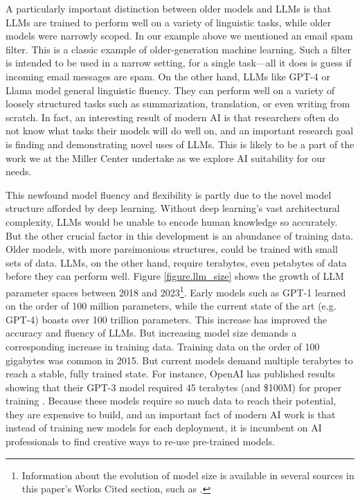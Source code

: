 \documentclass[12pt, oneside]{article}   	%
\begin{document}
A particularly important distinction between older models and LLMs is that LLMs are trained to perform well on a variety of linguistic tasks, while older models were narrowly scoped.  In our example above we mentioned an email spam filter.  This is a classic example of older-generation machine learning.  Such a filter is intended to be used in a narrow setting, for a single task---all it does is guess if incoming email messages are spam.  On the other hand, LLMs like GPT-4 or Llama model general linguistic fluency.  They can perform well on a variety of loosely structured tasks such as summarization, translation, or even writing from scratch.  In fact, an interesting result of modern AI is that researchers often do not know what tasks their models will do well on, and an important research goal is finding and demonstrating novel uses of LLMs.  This is likely to be a part of the work we at the Miller Center undertake as we explore AI suitability for our needs.

This newfound model fluency and flexibility is partly due to the novel model structure afforded by deep learning.  Without deep learning’s vast architectural complexity, LLMs would be unable to encode human knowledge so accurately.  But the other crucial factor in this development is an abundance of training data.  Older models, with more parsimonious structures, could be trained with small sets of data.  LLMs, on the other hand, require terabytes, even petabytes of data before they can perform well.  Figure \ref{figure.llm_size} shows the growth of LLM parameter spaces between 2018 and 2023\footnote{Information about the evolution of model size is available in several sources in this paper’s Works Cited section, such as \cite{shazeer:2017, wei:2022}.}.  Early models such as GPT-1 learned on the order of 100 million parameters, while the current state of the art (e.g. GPT-4) boasts over 100 trillion parameters.  This increase has improved the accuracy and fluency of LLMs.  But increasing model size demands a corresponding increase in training data.  Training data on the order of 100 gigabytes was common in 2015.  But current models demand multiple terabytes to reach a stable, fully trained state.  For instance, OpenAI has published results showing that their GPT-3 model required 45 terabytes (and \$100M) for proper training \cite{brown:2020}. Because these models require so much data to reach their potential, they are expensive to build, and an important fact of modern AI work is that instead of training new models for each deployment, it is incumbent on AI professionals to find creative ways to re-use pre-trained models.
\end{document}
